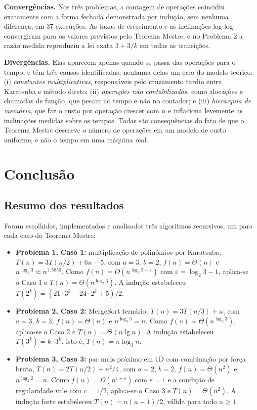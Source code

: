 \documentclass[11pt,a4paper]{article}
\begin{document}
\textbf{Convergências.} Nos três problemas, a contagem de operações coincidiu exatamente com a forma fechada demonstrada por indução, sem nenhuma diferença, em 37 execuções. As taxas de crescimento e as inclinações log-log convergiram para os valores previstos pelo Teorema Mestre, e no Problema 2 a razão medida reproduziu a lei exata $3+3/k$ em todas as transições.

\textbf{Divergências.} Elas aparecem apenas quando se passa das operações para o tempo, e têm três causas identificadas, nenhuma delas um erro do modelo teórico: (i) \emph{constantes multiplicativas}, responsáveis pelo cruzamento tardio entre Karatsuba e método direto; (ii) \emph{operações não contabilizadas}, como alocações e chamadas de função, que pesam no tempo e não no contador; e (iii) \emph{hierarquia de memória}, que faz o custo por operação crescer com $n$ e inflaciona levemente as inclinações medidas sobre os tempos. Todas são consequências do fato de que o Teorema Mestre descreve o número de operações em um modelo de custo uniforme, e não o tempo em uma máquina real.

\section{Conclusão}

\subsection{Resumo dos resultados}

Foram escolhidos, implementados e analisados três algoritmos recursivos, um para cada caso do Teorema Mestre:

\begin{itemize}[itemsep=2pt]
  \item \textbf{Problema 1, Caso 1:} multiplicação de polinômios por Karatsuba, $T(n)=3T(n/2)+6n-5$, com $a=3$, $b=2$, $f(n)=\Theta(n)$ e $n^{\log_2 3}\approx n^{1{,}5850}$. Como $f(n)=O(n^{\log_2 3-\varepsilon})$ com $\varepsilon=\log_2 3-1$, aplica-se o Caso 1 e $T(n)=\Theta(n^{\log_2 3})$. A indução estabeleceu $T(2^k)=(21\cdot3^k-24\cdot2^k+5)/2$.
  \item \textbf{Problema 2, Caso 2:} MergeSort ternário, $T(n)=3T(n/3)+n$, com $a=3$, $b=3$, $f(n)=\Theta(n)$ e $n^{\log_3 3}=n$. Como $f(n)=\Theta(n^{\log_3 3})$, aplica-se o Caso 2 e $T(n)=\Theta(n\lg n)$. A indução estabeleceu $T(3^k)=k\cdot3^k$, isto é, $T(n)=n\log_3 n$.
  \item \textbf{Problema 3, Caso 3:} par mais próximo em 1D com combinação por força bruta, $T(n)=2T(n/2)+n^2/4$, com $a=2$, $b=2$, $f(n)=\Theta(n^2)$ e $n^{\log_2 2}=n$. Como $f(n)=\Omega(n^{1+\varepsilon})$ com $\varepsilon=1$ e a condição de regularidade vale com $c=1/2$, aplica-se o Caso 3 e $T(n)=\Theta(n^2)$. A indução forte estabeleceu $T(n)=n(n-1)/2$, válida para todo $n\ge1$.
\end{itemize}
\end{document}
